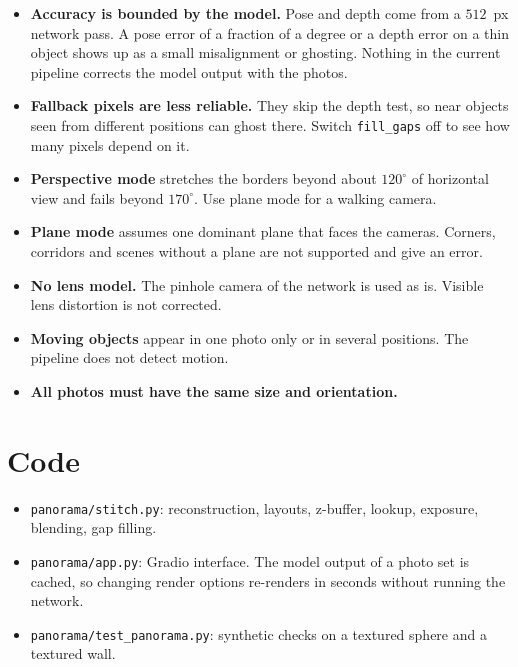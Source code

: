 \documentclass[11pt, a4paper]{article}
\begin{document}
\begin{itemize}
  \item \textbf{Accuracy is bounded by the model.} Pose and depth come from a $512$~px network pass. A pose error of a fraction of a degree
        or a depth error on a thin object shows up as a small misalignment or ghosting. Nothing in the current pipeline
        corrects the model output with the photos.
  \item \textbf{Fallback pixels are less reliable.} They skip the depth test, so near objects seen from different positions can ghost there.
        Switch \texttt{fill\_gaps} off to see how many pixels depend on it.
  \item \textbf{Perspective mode} stretches the borders beyond about $120^\circ$ of horizontal view and fails beyond $170^\circ$. Use plane mode for a walking camera.
  \item \textbf{Plane mode} assumes one dominant plane that faces the cameras. Corners, corridors and scenes without a plane are not supported and give an error.
  \item \textbf{No lens model.} The pinhole camera of the network is used as is. Visible lens distortion is not corrected.
  \item \textbf{Moving objects} appear in one photo only or in several positions. The pipeline does not detect motion.
  \item \textbf{All photos must have the same size and orientation.}
\end{itemize}

\section{Code}

\begin{itemize}
  \item \texttt{panorama/stitch.py}: reconstruction, layouts, z-buffer, lookup, exposure, blending, gap filling.
  \item \texttt{panorama/app.py}: Gradio interface. The model output of a photo set is cached, so changing render options re-renders in seconds without running the network.
  \item \texttt{panorama/test\_panorama.py}: synthetic checks on a textured sphere and a textured wall.
\end{itemize}
\end{document}
